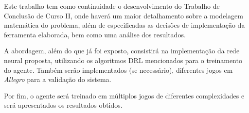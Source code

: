 Este trabalho tem como continuidade o desenvolvimento do Trabalho de Conclusão de Curso II, onde haverá um maior detalhamento sobre a modelagem matemática do problema, além de especificadas as decisões de implementação da ferramenta elaborada, bem como uma análise dos resultados.

A abordagem, além do que já foi exposto, consistirá na implementação da rede neural proposta, utilizando os algoritmos DRL mencionados para o treinamento do agente. Também serão implementados (se necessário), diferentes jogos em \textit{Allegro} para a validação do sistema.

Por fim, o agente será treinado em múltiplos jogos de diferentes complexidades e será apresentados os resultados obtidos.


